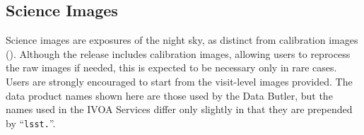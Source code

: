 


%

% 

%



\subsection{Science Images
\label{ssec:science_images}}
Science images are exposures of the night sky, as distinct from \gls{calibration} images ().
Although the release includes \gls{calibration} images, allowing users to reprocess the raw images if needed, this is expected to be necessary only in rare cases.
Users are strongly encouraged to start from the visit-level images provided.
The data product names shown here are those used by the Data \gls{Butler}, but the names used in the \gls{IVOA} Services differ only slightly in that they are prepended by ``\texttt{lsst.}''.

 
